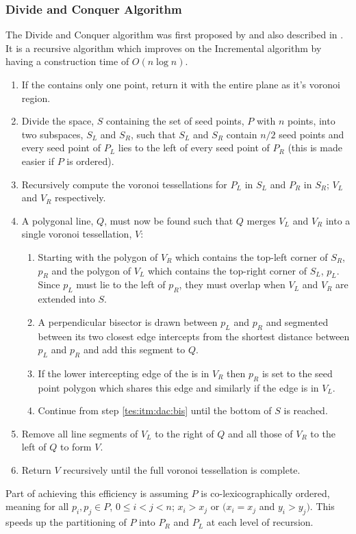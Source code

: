 \subsubsection{Divide and Conquer Algorithm}\label{tes:ssec:dac}
The Divide and Conquer algorithm was first proposed by \cite{shamos1975closest} and also described in \cite{okabe2009spatial}. It is a recursive algorithm which improves on the Incremental algorithm by having a construction time of $O(n\log n)$.
\begin{enumerate}
\item If the  contains only one point, return it with the entire plane as it's voronoi region.
\item Divide the space, $S$ containing the set of seed points, $P$ with $n$ points, into two subspaces, $S_L$ and $S_R$, such that $S_L$ and $S_R$ contain $n/2$ seed points and every seed point of $P_L$ lies to the left of every seed point of $P_R$ (this is made easier if $P$ is ordered).
\item Recursively compute the voronoi tessellations for $P_L$ in $S_L$ and $P_R$ in $S_R$; $V_L$ and $V_R$ respectively.
\item A polygonal line, $Q$, must now be found such that $Q$ merges $V_L$ and $V_R$ into a single voronoi tessellation, $V$:
\begin{enumerate}
 \item Starting with the polygon of $V_R$ which contains the top-left corner of $S_R$, $p_R$ and the polygon of $V_L$ which contains the top-right corner of $S_L$, $p_L$. Since $p_L$ must lie to the left of $p_R$, they must overlap when $V_L$ and $V_R$ are extended into $S$.
 \item\label{tes:itm:dac:bis} A perpendicular bisector is drawn between $p_L$ and $p_R$ and segmented between its two closest edge intercepts from the shortest distance between $p_L$ and $p_R$ and add this segment to $Q$.
 \item If the lower intercepting edge of the is in $V_R$ then $p_R$ is set to the seed point polygon which shares this edge and similarly if the edge is in $V_L$.
 \item Continue from step \ref{tes:itm:dac:bis} until the bottom of $S$ is reached.
\end{enumerate}
\item Remove all line segments of $V_L$ to the right of $Q$ and all those of $V_R$ to the left of $Q$ to form $V$.
\item Return $V$ recursively until the full voronoi tessellation is complete.
\end{enumerate}
Part of achieving this efficiency is assuming $P$ is co-lexicographically ordered, meaning for all $p_i,p_j \in P$, $0 \leq i < j < n$; $x_i > x_j$ or $(x_i = x_j$ and $y_i > y_j)$. This speeds up the partitioning of $P$ into $P_R$ and $P_L$ at each level of recursion.
%
